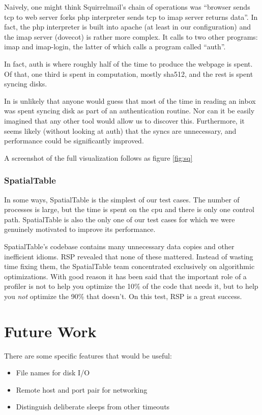 \documentclass[10pt]{article}
\begin{document}
Naively, one might think Squirrelmail's chain of operations was ``browser sends tcp to web server forks php interpreter sends tcp to imap server returns data''.  In fact, the php interpreter is built into apache (at least in our configuration) and the imap server (dovecot) is rather more complex.  It calls to two other programs: imap and imap-login, the latter of which calls a program called ``auth''.

In fact, auth is where roughly half of the time to produce the webpage is spent.  Of that, one third is spent in computation, mostly sha512, and the rest is spent syncing disks.

In is unlikely that anyone would guess that most of the time in reading an inbox was spent syncing disk as part of an authentication routine.  Nor can it be easily imagined that any other tool would allow us to discover this.  Furthermore, it seems likely (without looking at auth) that the syncs are unnecessary, and performance could be significantly improved.

A screenshot of the full visualization follows as figure \ref{fig:sq}

\subsubsection{SpatialTable}

In some ways, SpatialTable is the simplest of our test cases.  The number of processes is large, but the time is spent on the cpu and there is only one control path.  SpatialTable is also the only one of our test cases for which we were genuinely motivated to improve its performance.

SpatialTable's codebase contains many unnecessary data copies and other inefficient idioms.  RSP revealed that none of these mattered.  Instead of wasting time fixing them, the SpatialTable team concentrated exclusively on algorithmic optimizations.  With good reason it has been said that the important role of a profiler is not to help you optimize the 10\% of the code that needs it, but to help you \emph{not} optimize the 90\% that doesn't\cite{taoup}.  On this test, RSP is a great success.

\section{Future Work}

There are some specific features that would be useful:

\begin{itemize}
\item File names for disk I/O
\item Remote host and port pair for networking
\item Distinguish deliberate sleeps from other timeouts
\end{itemize}
\end{document}
